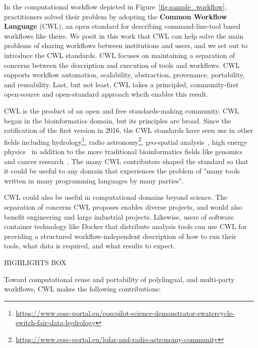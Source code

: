 \documentclass[sigconf,authordraft]{acmart}
\begin{document}
In the computational workflow depicted in Figure~\ref{fig:sample_workflow}, practitioners solved their problem by adopting the \textbf{Common Workflow Language} (CWL), an open standard for describing command-line-tool based workflows like theirs. We posit in this work that CWL can help solve the main problems of sharing workflows between institutions and users, and we set out to introduce the CWL standards. CWL focuses on maintaining a separation of concerns between the description and execution of tools and workflows. CWL supports workflow automation, scalability, abstraction, provenance, portability, and reusability. Last, but not least, CWL takes a principled, community-first open-source and open-standard approach whcih enables this result.

CWL is the product of an open and free standards-making community. CWL began in the bioinformatics domain, but its principles are broad. Since the ratification of the first version in 2016, the CWL standards have seen use in other fields including hydrology\footnote{\url{https://www.eosc-portal.eu/eoscpilot-science-demonstrator-ewatercycle-switch-fair-data-hydrology}}, radio astronomy\footnote{\url{https://www.eosc-portal.eu/lofar-and-radio-astronomy-community}}, geo-spatial analysis~\cite{simonis_ogc_2020,goncalves_ogc_2020,landry_ogc_2020}, high energy physics~\cite{bell_web-based_2017} in addition to the more traditional bioinformatics fields like genomics and cancer research~\cite{kaushik_building_2019}. The many CWL contributors shaped the standard so that it could be useful to any domain that experiences the problem of "many tools written in many programming languages by many parties".

CWL could also be useful in computational domains beyond science. The separation of concerns CWL proposes enables diverse projects, and would also benefit engineering and large industrial projects. Likewise, users of software container technology like Docker that distribute analysis tools can use CWL for providing a structured workflow-independent description of how to run their tools, what data is required, and what results to expect.

HIGHLIGHTS BOX

Toward computational reuse and portability of polylingual, and multi-party workflows, CWL makes the following contributions:
\end{document}
